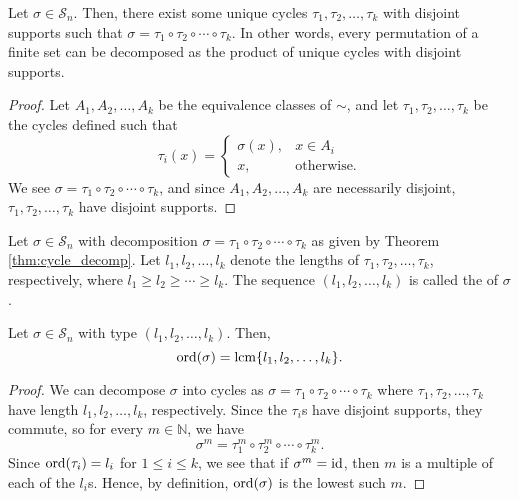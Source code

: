 \begin{thm}\label{thm:cycle_decomp}
Let $ \sigma\in\mathcal{S}_n $. Then, there exist some unique cycles $ \tau_1,\tau_2,\ldots,\tau_k $ with disjoint supports such that $ \sigma=\tau_1\circ\tau_2\circ\cdots\circ\tau_k $. In other words, every permutation of a finite set can be decomposed as the product of unique cycles with disjoint supports.
\end{thm}
\begin{proof}
Let $ A_1,A_2,\ldots,A_k $ be the equivalence classes of $ \sim $, and let $ \tau_1,\tau_2,\ldots,\tau_k $ be the cycles defined such that 
\begin{equation*}
    \tau_i(x)=
    \left\{\begin{array}{ll}
        \sigma(x), & x\in A_i \\
        x, & \text{otherwise.}
    \end{array}\right.
\end{equation*}
We see $ \sigma=\tau_1\circ\tau_2\circ\cdots\circ\tau_k $, and since $ A_1,A_2,\ldots,A_k $ are necessarily disjoint, $ \tau_1,\tau_2,\ldots,\tau_k $ have disjoint supports.
\end{proof}

\begin{defn}
Let $ \sigma\in\mathcal{S}_n $ with decomposition $ \sigma=\tau_1\circ\tau_2\circ\cdots\circ\tau_k $ as given by Theorem \ref{thm:cycle_decomp}. Let $ l_1,l_2,\ldots,l_k $ denote the lengths of $ \tau_1,\tau_2,\ldots,\tau_k $, respectively, where $ l_1\geq l_2\geq\cdots\geq l_k $. The sequence $ (l_1,l_2,\ldots,l_k) $ is called the  of $ \sigma $.
\end{defn}

\begin{prop}
Let $ \sigma\in\mathcal{S}_n $ with type $ (l_1,l_2,\ldots,l_k) $. Then,
\begin{equation*}
    \operatorname{ord}(\sigma)=\operatorname{lcm}\{l_1,l_2,\ldots,l_k\}.
\end{equation*}
\end{prop}
\begin{proof}
We can decompose $ \sigma $ into cycles as $ \sigma=\tau_1\circ\tau_2\circ\cdots\circ\tau_k $ where $ \tau_1,\tau_2,\ldots,\tau_k $ have length $ l_1,l_2,\ldots,l_k $, respectively. Since the $ \tau_i $s have disjoint supports, they commute, so for every $ m\in\mathbb{N} $, we have
\begin{equation*}
    \sigma^m=\tau_1^m\circ\tau_2^m\circ\cdots\circ\tau_k^m.
\end{equation*}
Since $ \operatorname{ord}(\tau_i)=l_i $ for $ 1\leq i\leq k $, we see that if $ \sigma^m=\operatorname{id} $, then $ m $ is a multiple of each of the $ l_i $s. Hence, by definition, $ \operatorname{ord}(\sigma) $ is the lowest such $ m $.
\end{proof}


